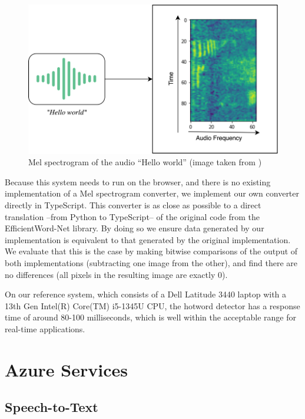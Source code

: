 \documentclass[a4paper,12pt,twoside]{ThesisStyle}
\begin{document}
\begin{figure}[htb]
  \centering
  \includegraphics[width=1\textwidth]{imatges/MelSpectrogram.png}
  \caption{Mel spectrogram of the audio ``Hello world'' (image taken from \cite{Chidhambararajan2022EfficientWordNet})}
  \label{fig:mel_spectrogram}
\end{figure}

Because this system needs to run on the browser, and there is no existing implementation of a Mel spectrogram converter, we implement our own converter directly in TypeScript. This converter is as close as possible to a direct translation --from Python to TypeScript-- of the original code from the EfficientWord-Net library. By doing so we ensure data generated by our implementation is equivalent to that generated by the original implementation. We evaluate that this is the case by making bitwise comparisons of the output of both implementations (subtracting one image from the other), and find there are no differences (all pixels in the resulting image are exactly 0).

On our reference system, which consists of a Dell Latitude 3440 laptop with a 13th Gen Intel(R) Core(TM) i5-1345U CPU, the hotword detector has a response time of around 80-100 milliseconds, which is well within the acceptable range for real-time applications.

\section{Azure Services}
\label{sec:azure_services}

\subsection{Speech-to-Text}
\label{subsec:speech_to_text}
\end{document}
